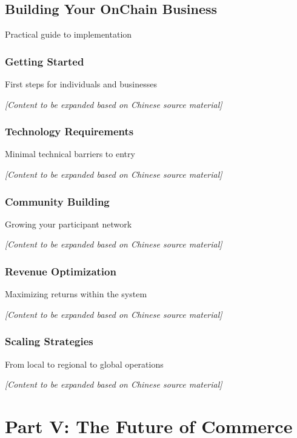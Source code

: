 \documentclass[
  Letterpaper,
]{scrbook}
\begin{document}
\chapter{Building Your OnChain Business}\label{sec-building-business}

Practical guide to implementation

\section{Getting Started}\label{getting-started}

First steps for individuals and businesses

\emph{{[}Content to be expanded based on Chinese source material{]}}

\section{Technology Requirements}\label{technology-requirements}

Minimal technical barriers to entry

\emph{{[}Content to be expanded based on Chinese source material{]}}

\section{Community Building}\label{community-building}

Growing your participant network

\emph{{[}Content to be expanded based on Chinese source material{]}}

\section{Revenue Optimization}\label{revenue-optimization}

Maximizing returns within the system

\emph{{[}Content to be expanded based on Chinese source material{]}}

\section{Scaling Strategies}\label{scaling-strategies}

From local to regional to global operations

\emph{{[}Content to be expanded based on Chinese source material{]}}

\part{Part V: The Future of Commerce}
\end{document}
